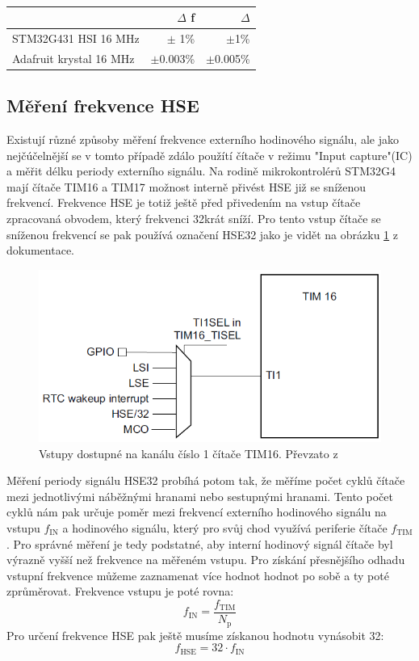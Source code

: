 \begin{table}[H]
	\begin{tabular}{l|rr}
		& $\Delta$ f & $\Delta$ \\ \hline
		STM32G431 HSI 16 MHz     & $\pm$ 1\%       & $\pm$1\%      \\ \hline
		Adafruit krystal 16 MHz & $\pm$0.003\%   & $\pm$0.005\% 
	\end{tabular}
	\caption{}
	\label{tab:HSE}
\end{table}

\subsection{Měření frekvence HSE}
Existují různé způsoby měření frekvence externího hodinového signálu, ale jako nejčúčelnější se v tomto případě zdálo použítí čítače v režimu "Input capture"(IC) a měřit délku periody externího signálu. Na rodině mikrokontrolérů STM32G4 mají čítače TIM16 a TIM17 možnost interně přivést HSE již se sníženou frekvencí. Frekvence HSE je totiž ještě před přivedením na vstup čítače zpracovaná obvodem, který frekvenci 32krát sníží. Pro tento vstup čítače se sníženou frekvencí se pak používá označení HSE32 jako je vidět na obrázku \ref{fig:tim16inputs} z dokumentace.

\begin{figure}[H]
	\centering
	\includegraphics[width=0.7\linewidth]{Figs/Documentation/TIM16_Inputs}
	\caption[Vstupy čítače TIM16]{Vstupy dostupné na kanálu číslo 1 čítače TIM16. Převzato z\cite{refG4}}
	\label{fig:tim16inputs}
\end{figure}

Měření periody signálu HSE32 probíhá potom tak, že měříme počet cyklů čítače mezi jednotlivými náběžnými hranami nebo sestupnými hranami. Tento počet cyklů nám pak určuje poměr mezi frekvencí externího hodinového signálu na vstupu $	f_{\text{IN}}$ a hodinového signálu, který pro svůj chod využívá periferie čítače $	f_{\text{TIM}}$. Pro správné měření je tedy podstatné, aby interní hodinový signál čítače byl výrazně vyšší než frekvence na měřeném vstupu. Pro získání přesnějšího odhadu vstupní frekvence můžeme zaznamenat více hodnot hodnot po sobě a ty poté zprůměrovat. Frekvence vstupu je poté rovna:
\begin{equation}
	f_{\text{IN}}=\frac{f_{\text{TIM}}}{N_\text{p}}
\end{equation}
Pro určení frekvence HSE pak ještě musíme získanou hodnotu vynásobit 32:
\begin{equation}
	f_{\text{HSE}}=32 \cdot f_{\text{IN}}
\end{equation}
